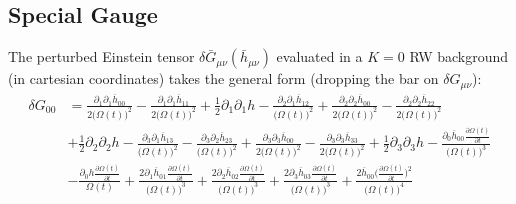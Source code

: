 \documentclass[10pt,letterpaper]{article}
\begin{document}
\subsection{Special Gauge}
The perturbed Einstein tensor $\delta \bar G_{\mu\nu}(\bar h_{\mu\nu})$ evaluated in a $K=0$ RW background (in cartesian coordinates) takes the general form (dropping the bar on $\delta G_{\mu\nu}$):
\begin{align}
	\delta  G_{00} &= \frac{\partial_{1}\partial_{1}\overline{h}_{00}}{2 \bigl(\Omega(t)\bigr)^2} -  \frac{\partial_{1}\partial_{1}\overline{h}_{11}}{2 \bigl(\Omega(t)\bigr)^2} + \tfrac{1}{2} \partial_{1}\partial_{1}h -  \frac{\partial_{2}\partial_{1}\overline{h}_{12}}{\bigl(\Omega(t)\bigr)^2} + \frac{\partial_{2}\partial_{2}\overline{h}_{00}}{2 \bigl(\Omega(t)\bigr)^2} -  \frac{\partial_{2}\partial_{2}\overline{h}_{22}}{2 \bigl(\Omega(t)\bigr)^2} \\
&+ \tfrac{1}{2} \partial_{2}\partial_{2}h -  \frac{\partial_{3}\partial_{1}\overline{h}_{13}}{\bigl(\Omega(t)\bigr)^2} -  \frac{\partial_{3}\partial_{2}\overline{h}_{23}}{\bigl(\Omega(t)\bigr)^2} + \frac{\partial_{3}\partial_{3}\overline{h}_{00}}{2 \bigl(\Omega(t)\bigr)^2} -  \frac{\partial_{3}\partial_{3}\overline{h}_{33}}{2 \bigl(\Omega(t)\bigr)^2} + \tfrac{1}{2} \partial_{3}\partial_{3}h -  \frac{\partial_{0}\overline{h}_{00} \frac{\partial \Omega(t)}{\partial t}}{\bigl(\Omega(t)\bigr)^3}\\
& -  \frac{\partial_{0}h \frac{\partial \Omega(t)}{\partial t}}{\Omega(t)} + \frac{2 \partial_{1}\overline{h}_{01} \frac{\partial \Omega(t)}{\partial t}}{\bigl(\Omega(t)\bigr)^3} + \frac{2 \partial_{2}\overline{h}_{02} \frac{\partial \Omega(t)}{\partial t}}{\bigl(\Omega(t)\bigr)^3} + \frac{2 \partial_{3}\overline{h}_{03} \frac{\partial \Omega(t)}{\partial t}}{\bigl(\Omega(t)\bigr)^3} + \frac{2 \overline{h}_{00} \bigl(\frac{\partial \Omega(t)}{\partial t}\bigr)^2}{\bigl(\Omega(t)\bigr)^4}
\end{align}
\end{document}
